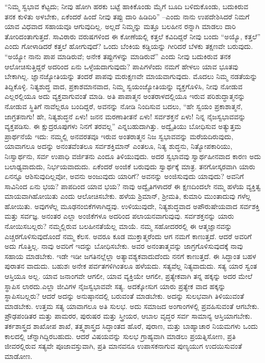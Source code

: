 “ನಿಮ್ಮ ಸ್ವಭಾವ ಕೆಟ್ಟದು; ನೀವು ಹೋಗಿ ಹರಕು ಬಟ್ಟೆ ಹಾಕಿಕೊಂಡು ಮೈಗೆ ಬೂದಿ ಬಳಿದುಕೊಂಡು, ಬದುಕಿರುವ ತನಕ ಕುಳಿತು ಅಳಬೇಕು, ಏಕೆಂದರೆ ಹಿಂದೆ ನೀವು ತಪ್ಪು ದಾರಿ ಹಿಡಿದಿರಿ” –ಎಂದು ನಾನು ಉಪದೇಶಿಸಿದರೆ ನಿಮಗೆ ಯಾವ ವಿಧವಾದ ಸಹಾಯವೂ ಆಗುವುದಿಲ್ಲ. ಅಲ್ಲದೆ ನಿಮ್ಮನ್ನು ಮತ್ತೂ ಬಲಹೀನ ರನ್ನಾಗಿ ಮಾಡಲು ದಾರಿ ತೋರಿದಂತಾಗುತ್ತದೆ. ಸಾವಿರಾರು ವರುಷಗಳಿಂದ ಈ ಕೋಣೆಯಲ್ಲಿ ಕತ್ತಲೆ ಕವಿದಿದ್ದರೆ ನೀವು ಬಂದು “ಅಯ್ಯೊ, ಕತ್ತಲೆ” ಎಂದು ಗೋಳಾಡಿದರೆ ಕತ್ತಲೆ ಹೋಗುವುದೆ? ಒಂದು ಬೆಂಕಿಯ ಕಡ್ಡಿಯನ್ನು ಗೀರಿದರೆ ಬೆಳಕು ತಕ್ಷಣವೇ ಬರುವುದು. “ಅಯ್ಯೋ ನಾನು ಪಾಪ ಮಾಡಿರುವೆ; ಅನೇಕ ತಪ್ಪುಗಳನ್ನು ಮಾಡಿರುವೆ” ಎಂದು ನೀವು ಬದುಕಿರುವ ತನಕ ಆಲೋಚಿಸುತ್ತಿದ್ದರೆ ಅದರಿಂದ ಏನು ಒಳ್ಳೆಯದಾಗುವುದು? ಪಾಪಿಗಳೆಂದು ನಮಗೆ ಹೇಳಲು ಯಾವ ಭೂತವು ಬೇಕಾಗಿಲ್ಲ. ಜ್ಞಾನಜ್ಯೋತಿಯನ್ನು ತಂದರೆ ಪಾಪವು ಮರುಕ್ಷಣವೇ ಮಾಯವಾಗುವುದು. ಮೊದಲು ನಿಮ್ಮ ನಡತೆಯನ್ನು ತಿದ್ದಿಕೊಳ್ಳಿ. ನಿತ್ಯಶುದ್ಧ ವಾದ, ಪ್ರಕಾಶಮಾನವಾದ, ನಿಮ್ಮ ಸ್ವಯಂಜ್ಯೋತಿಯನ್ನು ವ್ಯಕ್ತಗೊಳಿಸಿ, ನೀವು ನೋಡುವ ಎಲ್ಲರಲ್ಲಿಯೂ ಅದು ವ್ಯಕ್ತವಾಗುವಂತೆ ಮಾಡಿ. ಅತಿ ಪಾಪಾತ್ಮನ ಅಂತರಾಳದಲ್ಲಿಯೂ ಇರುವ ಪರಿಶುದ್ಧಾತ್ಮನನ್ನು ನೋಡುವ ಸ್ಥಿತಿಗೆ ನಾವೆಲ್ಲರೂ ಬಂದಿದ್ದರೆ, ಅವನನ್ನು ನೋಡಿ ನಿಂದಿಸುವ ಬದಲು, “ಹೇ ಸ್ವಯಂ ಪ್ರಕಾಶಾತ್ಮನೆ, ಜಾಗ್ರತನಾಗು! ಹೇ, ನಿತ್ಯಶುದ್ಧನೆ ಏಳು! ಜನನ ಮರಣಾತೀತನೆ ಏಳು! ಸರ್ವಶಕ್ತನೆ ಏಳು! ನಿನ್ನ ನೈಜಸ್ವಭಾವವನ್ನು ವ್ಯಕ್ತಪಡಿಸು. ಈ ಕ್ಷುದ್ರರೂಪುಗಳು ನಿನಗೆ ತರವಲ್ಲ” ಎನ್ನಬಹುದಾಗಿತ್ತು. ಅದ್ವೈತಿಯು ಬೋಧಿಸುವ ಅತ್ಯುತ್ತಮ ಪ್ರಾರ್ಥನೆಯೆ ಇದು: ನಮ್ಮಲ್ಲಿ ಅನವರತವೂ ಇರುವ ಅಂತರಾತ್ಮನ ನಿಜ ಸ್ವಭಾವವನ್ನು ಮರೆಯದಿರುವುದು, ಯಾವಾಗಲೂ ಅದನ್ನು ಅನಂತವೆಂತಲೂ ಸರ್ವಶಕ್ತಿಮಾನ್​ ಎಂತಲೂ, ನಿತ್ಯ ಶುದ್ಧನು, ನಿತ್ಯೋಪಕಾರಿಯು, ನಿಃಸ್ವಾರ್ಥನು, ಸರ್ವ ಉಪಾಧಿ ವರ್ಜಿತನು ಎಂದೂ ತಿಳಿಯುವುದು. ಅದರ ಸ್ವಭಾವವು ಸ್ವಾರ್ಥಹೀನವಾದ ಕಾರಣ ಅದು ಬಲಾಢ್ಯವಾದುದು, ನಿರ್ಭಯವಾದುದು. ಏಕೆಂದರೆ ಅಂಜಿಕೆ ಬರುವುದು ಸ್ವಾರ್ಥಕ್ಕೆ ಮಾತ್ರ. ತನಗೋಸ್ಕರವಾಗಿ ಯಾರು ಏನನ್ನೂ ಆಶಿಸುವುದಿಲ್ಲವೋ, ಅವನು ಅಂಜುವುದು ಯಾರಿಗೆ? ಅವನನ್ನು ಅಂಜಿಸುವುದು ಯಾವುದು? ಅವನಿಗೆ ಸಾವಿನಿಂದ ಏನು ಭಯ? ಪಾಪದಿಂದ ಯಾವ ಭಯ? ನಾವು ಅದ್ವೈತಿಗಳಾದರೆ ಈ ಕ್ಷಣದಿಂದಲೇ ನಮ್ಮ ಹಳೆಯ ವ್ಯಕ್ತಿತ್ವ ಮಾಯವಾಗಿಹೋಯಿತು ಎಂದು ಆಲೋಚಿಸಬೇಕು. ಹಳೆಯ ಶ್ರಿಮಾನ್​, ಶ‍್ರೀಮತಿ, ಕುಮಾರಿ ಮುಂತಾದುವು ಗಳೆಲ್ಲ ಹೋಯಿತು. ಅವುಗಳೆಲ್ಲ ಮೂಢನಂಬಿಕೆಗಳಾಗಿದ್ದವು. ಉಳಿಯುವುದೇ, ನಿತ್ಯಶುದ್ಧವಾದ ಅಪೌರುಷೇಯವಾದ ಸರ್ವಶಕ್ತಿ ಮತ್ತು ಸರ್ವಜ್ಞ. ಅನಂತರ ಎಲ್ಲಾ ಅಂಜಿಕೆಗಳೂ ಅದರಿಂದ ಪಲಾಯನವಾಗುವುವು. ಸರ್ವಶಕ್ತನನ್ನು ಯಾರು ನೋಯಿಸಬಲ್ಲರು? ನಮ್ಮಲ್ಲಿರುವ ಬಲಹೀನತೆಯೆಲ್ಲ ಮಾಯೆ. ನಮ್ಮ ಸಹೋದರರಲ್ಲಿ ಈ ಆತ್ಮಜ್ಞಾನವನ್ನು ಎಚ್ಚರಗೊಳಿಸುವುದೊಂದೆ ನಮ್ಮ ಕೆಲಸ. ಅವರೂ ಕೂಡ ಮುಕ್ತಾತ್ಮರೆಂದು ಆಗ ನಮಗೆ ಕಾಣುತ್ತದೆ. ಆದರೆ ಅವರಿಗೆ ಅದು ಗೊತ್ತಿಲ್ಲ. ನಾವು ಅವರಿಗೆ ಇದನ್ನು ಬೋಧಿಸಬೇಕು. ಅವರ ಅನಂತಾತ್ಮವನ್ನು ಜಾಗ್ರಗೊಳಿಸುವುದಕ್ಕೆ ನಾವು ಸಹಾಯ ಮಾಡಬೇಕು. ಇಡೇ ಇಡೀ ಜಗತಿನಲ್ಲೆಲ್ಲಾ ಅತ್ಯಾವಶ್ಯಕವಾದುದೆಂದು ನನಗೆ ಕಾಣುತ್ತದೆ. ಈ ಸಿದ್ಧಾಂತ ಬಹಳ ಪುರಾತನ ವಾದುದು. ಬಹುಶಃ ಅನೇಕ ಪರ್ವತಗಳಿಗಿಂತಲೂ ಹಳೆಯದು. ಸತ್ಯವೆಲ್ಲ ನಿತ್ಯವಾದುದು. ಸತ್ಯ ಯಾರ ಸ್ವಂತ ಆಸ್ತಿಯೂ ಅಲ್ಲ. ಯಾವ ಜನಾಂಗವೇ ಆಗಲೀ, ಯಾವ ವ್ಯಕ್ತಿಯೇ ಆಗಲೀ, ಪ್ರತ್ಯೇಕವಾಗಿ ತನ್ನ ಹಕ್ಕನ್ನು ಅದರ ಮೇಲೆ ಸ್ಥಾಪಿಸ ಲಾರದು.ಎಲ್ಲಾ ಜೀವಿಗಳ ನೈಜಸ್ವಭಾವವೇ ಸತ್ಯ. ಅದಕ್ಕೋಸುಗ ಯಾರು ಪ್ರತ್ಯೇಕ ವಾದ ಹಕ್ಕನ್ನು ಸ್ಥಾಪಿಸಬಲ್ಲರು? ಆದರೆ ಅದನ್ನು ಅನುಷ್ಠಾನದಲ್ಲಿ ಬರುವಂತೆ ಮಾಡಬೇಕು. ಅದನ್ನು ಸುಲಭವಾಗಿ ತಿಳಿಯುವಂತೆ ಮಾಡಬೇಕು. ಉತ್ತಮ ಸತ್ಯ ಯಾವಾಗಲೂ ಅತಿ ಸುಲಭ. ಅದು ಸಮಾಜದ ಅಂಗಾಂಗಳಲ್ಲಿ ಪ್ರವಹಿಸುವಂತೆ ಆಗಬೇಕು. ಪ್ರೌಢಪಂಡಿತರ ಮತ್ತು ಪಾಮರರ, ಪುರುಷರ ಮತ್ತು ಸ್ತ್ರೀಯರ, ಆಬಾಲ ವೃದ್ಧರ ಸರ್ವ ಸಾಮಾನ್ಯ ಆಸ್ತಿಯಾಗಬೇಕು. ತರ್ಕಶಾಸ್ತ್ರದ ಶಾಖೋಪ ಶಾಖೆ, ತತ್ತ್ವಶಾಸ್ತ್ರದ ಸಿದ್ಧಾಂತದ ಹೊರೆ, ಪುರಾಣ, ಮತ್ತು ಬಾಹ್ಯಾಚಾರ ನಿಯಮಗಳು ಒಂದು ಕಾಲದಲ್ಲಿ ಚೆನ್ನಾಗಿದ್ದಿರಬಹುದು. ಆದರೆ ವಿಷಯವನ್ನು ಸುಲಭ ಗ್ರಾಹ್ಯವಾಗಿ ಮಾಡಲು ಪ್ರಯತ್ನಿಸೋಣ, ಪ್ರತಿ ಜೀವರಲ್ಲಿರುವ ಸತ್ಯವೇ ಪೂಜಾವಸ್ತುವಾಗಿ, ಪ್ರತಿ ಮಾನವನೂ ಉಪಾಸಕನಾಗುವ ಪುಣ್ಯಯುಗ ಉದಯಿಸುವಂತೆ ಮಾಡೋಣ.

